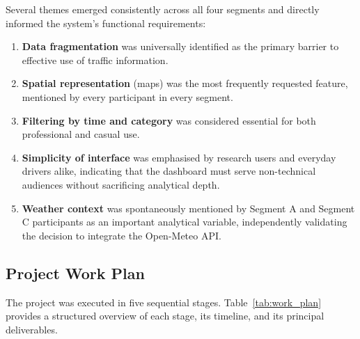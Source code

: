\documentclass[12pt,a4paper]{report}
\begin{document}
Several themes emerged consistently across all four segments and directly informed the system's
functional requirements:

\begin{enumerate}[leftmargin=2cm, label=\arabic*.]
  \item \textbf{Data fragmentation} was universally identified as the primary barrier to
        effective use of traffic information.
  \item \textbf{Spatial representation} (maps) was the most frequently requested feature,
        mentioned by every participant in every segment.
  \item \textbf{Filtering by time and category} was considered essential for both professional
        and casual use.
  \item \textbf{Simplicity of interface} was emphasised by research users and everyday drivers
        alike, indicating that the dashboard must serve non-technical audiences without
        sacrificing analytical depth.
  \item \textbf{Weather context} was spontaneously mentioned by Segment A and Segment C
        participants as an important analytical variable, independently validating the
        decision to integrate the Open-Meteo API.
\end{enumerate}

\subsection{Project Work Plan}

The project was executed in five sequential stages. Table~\ref{tab:work_plan} provides a
structured overview of each stage, its timeline, and its principal deliverables.

\renewcommand{\arraystretch}{1.4}
\end{document}
